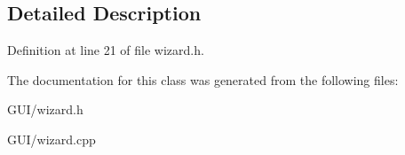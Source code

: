 \subsection{Detailed Description}


Definition at line 21 of file wizard.\+h.



The documentation for this class was generated from the following files\+:\begin{DoxyCompactItemize}
\item 
G\+U\+I/wizard.\+h\item 
G\+U\+I/wizard.\+cpp\end{DoxyCompactItemize}
